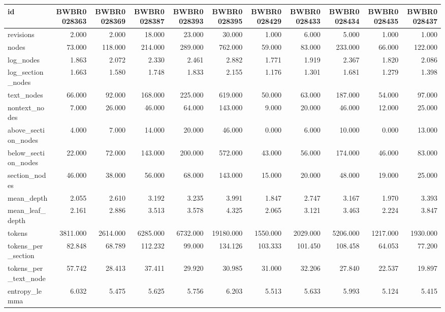 \begin{tabular}{lrrrrrrrrrr}
\toprule
id & BWBR0028363 & BWBR0028369 & BWBR0028387 & BWBR0028393 & BWBR0028395 & BWBR0028429 & BWBR0028433 & BWBR0028434 & BWBR0028435 & BWBR0028437 \\
\midrule
revisions & 2.000 & 2.000 & 18.000 & 23.000 & 30.000 & 1.000 & 6.000 & 5.000 & 1.000 & 1.000 \\
\cline{1-11}
nodes & 73.000 & 118.000 & 214.000 & 289.000 & 762.000 & 59.000 & 83.000 & 233.000 & 66.000 & 122.000 \\
\cline{1-11}
log\_nodes & 1.863 & 2.072 & 2.330 & 2.461 & 2.882 & 1.771 & 1.919 & 2.367 & 1.820 & 2.086 \\
\cline{1-11}
log\_section\_nodes & 1.663 & 1.580 & 1.748 & 1.833 & 2.155 & 1.176 & 1.301 & 1.681 & 1.279 & 1.398 \\
\cline{1-11}
text\_nodes & 66.000 & 92.000 & 168.000 & 225.000 & 619.000 & 50.000 & 63.000 & 187.000 & 54.000 & 97.000 \\
\cline{1-11}
nontext\_nodes & 7.000 & 26.000 & 46.000 & 64.000 & 143.000 & 9.000 & 20.000 & 46.000 & 12.000 & 25.000 \\
\cline{1-11}
above\_section\_nodes & 4.000 & 7.000 & 14.000 & 20.000 & 46.000 & 0.000 & 6.000 & 10.000 & 0.000 & 13.000 \\
\cline{1-11}
below\_section\_nodes & 22.000 & 72.000 & 143.000 & 200.000 & 572.000 & 43.000 & 56.000 & 174.000 & 46.000 & 83.000 \\
\cline{1-11}
section\_nodes & 46.000 & 38.000 & 56.000 & 68.000 & 143.000 & 15.000 & 20.000 & 48.000 & 19.000 & 25.000 \\
\cline{1-11}
mean\_depth & 2.055 & 2.610 & 3.192 & 3.235 & 3.991 & 1.847 & 2.747 & 3.167 & 1.970 & 3.393 \\
\cline{1-11}
mean\_leaf\_depth & 2.161 & 2.886 & 3.513 & 3.578 & 4.325 & 2.065 & 3.121 & 3.463 & 2.224 & 3.847 \\
\cline{1-11}
tokens & 3811.000 & 2614.000 & 6285.000 & 6732.000 & 19180.000 & 1550.000 & 2029.000 & 5206.000 & 1217.000 & 1930.000 \\
\cline{1-11}
tokens\_per\_section & 82.848 & 68.789 & 112.232 & 99.000 & 134.126 & 103.333 & 101.450 & 108.458 & 64.053 & 77.200 \\
\cline{1-11}
tokens\_per\_text\_node & 57.742 & 28.413 & 37.411 & 29.920 & 30.985 & 31.000 & 32.206 & 27.840 & 22.537 & 19.897 \\
\cline{1-11}
entropy\_lemma & 6.032 & 5.475 & 5.625 & 5.756 & 6.203 & 5.513 & 5.633 & 5.993 & 5.124 & 5.415 \\

\end{tabular}
